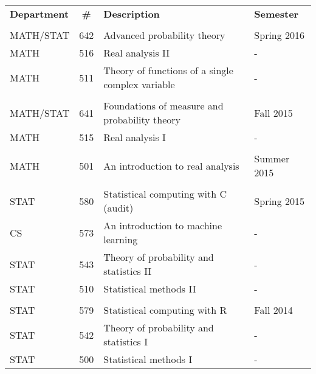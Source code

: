 \documentclass{res} %
\begin{document}
\begin{resume}
\begin{tabularx}{\textwidth}{lcXl}
  {\bf Department} & {\bf \#} & {\bf Description} & {\bf Semester} \\
  \\
  MATH/STAT & 642 & Advanced probability theory & Spring 2016 \\
  MATH & 516 & Real analysis II & - \\
  MATH & 511 & Theory of functions of a single complex variable  & - \\
  \\
  MATH/STAT & 641 & Foundations of measure and probability theory & Fall 2015 \\
  MATH & 515 & Real analysis I & - \\
  \\
  MATH & 501 & An introduction to real analysis & Summer 2015 \\
  \\
  STAT & 580 & Statistical computing with C (audit) & Spring 2015 \\
  CS & 573 & An introduction to machine learning & - \\
  STAT & 543 & Theory of probability and statistics II & - \\
  STAT & 510 & Statistical methods II & - \\
  \\
  STAT & 579 & Statistical computing with R & Fall 2014 \\
  STAT & 542 & Theory of probability and statistics I & - \\
  STAT & 500 & Statistical methods I & - \\
\end{tabularx}



\end{resume} 
\end{document}
